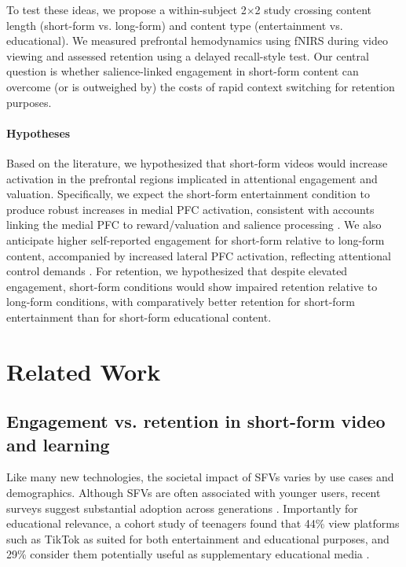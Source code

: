 \documentclass[10pt, twocolumn]{article}
\begin{document}
To test these ideas, we propose a within-subject 2$\times$2 study crossing content length (short-form vs. long-form) and content type (entertainment vs. educational). We measured prefrontal hemodynamics using fNIRS during video viewing and assessed retention using a delayed recall-style test. Our central question is whether salience-linked engagement in short-form content can overcome (or is outweighed by) the costs of rapid context switching for retention purposes.

\paragraph{Hypotheses}
Based on the literature, we hypothesized that short-form videos would increase activation in the prefrontal regions implicated in attentional engagement and valuation. Specifically, we expect the short-form entertainment condition to produce robust increases in medial PFC activation, consistent with accounts linking the medial PFC to reward/valuation and salience processing \cite{Bartra2013TheVS, Euston2012TheRO, Rushworth2011FrontalCA}. We also anticipate higher self-reported engagement for short-form relative to long-form content, accompanied by increased lateral PFC activation, reflecting attentional control demands \cite{Miller2001AnIT, Buschman2007TopDownVB}. For retention, we hypothesized that despite elevated engagement, short-form conditions would show impaired retention relative to long-form conditions, with comparatively better retention for short-form entertainment than for short-form educational content.

\section{Related Work}

\subsection{Engagement vs. retention in short-form video and learning}
Like many new technologies, the societal impact of SFVs varies by use cases and demographics. Although SFVs are often associated with younger users, recent surveys suggest substantial adoption across generations \cite{mcclain_eddy_2026_tiktok_facts}. Importantly for educational relevance, a cohort study of teenagers found that 44\% view platforms such as TikTok as suited for both entertainment and educational purposes, and 29\% consider them potentially useful as supplementary educational media \cite{Adelhardt_Eberle_2024}.
\end{document}
